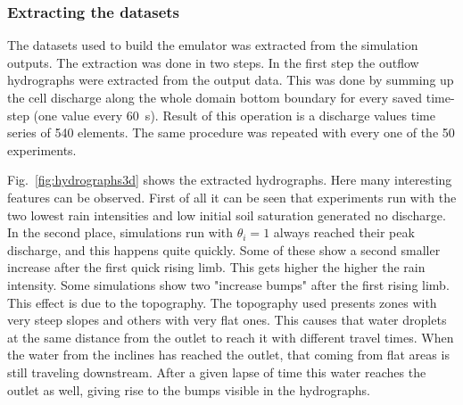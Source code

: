 {\subsubsection{Extracting the datasets}




The datasets used to build the emulator was extracted from the simulation outputs.
The extraction was done in two steps.
In the first step the outflow hydrographs were extracted from the output data. 
This was done by summing up the cell discharge along the whole domain bottom boundary for every saved time-step (one value every \SI{60}{\second}).
Result of this operation is a discharge values time series of \num{540} elements.
The same procedure was repeated with every one of the \num{50} experiments.

Fig.~\ref{fig:hydrographs3d} shows the extracted hydrographs.
Here many interesting features can be observed.
First of all it can be seen that experiments run with the two lowest rain intensities and low initial soil saturation generated no discharge.
In the second place, simulations run with $\theta_i = \num{1}$ always reached their peak discharge, and this happens quite quickly.
Some of these show a second smaller increase after the first quick rising limb.
This gets higher the higher the rain intensity.
Some simulations show two "increase bumps" after the first rising limb.
This effect is due to the topography.
The topography used presents zones with very steep slopes and others with very flat ones.
This causes that water droplets at the same distance from the outlet to reach it with different travel times.
When the water from the inclines has reached the outlet, that coming from flat areas is still traveling downstream.
After a given lapse of time this water reaches the outlet as well, giving rise to the bumps visible in the hydrographs.\\

}

